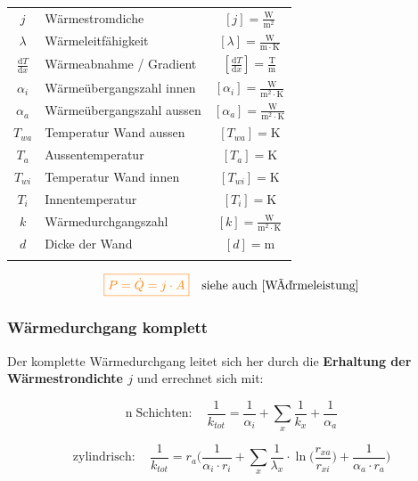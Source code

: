 \begin{tabular}{c l c}
	\rule{0pt}{10pt}$j$ & Wärmestromdiche & $[j] = \mathrm{\frac{W}{m^2}}$ \\
	\rule{0pt}{10pt}$\lambda$ & Wärmeleitfähigkeit & $[\lambda] = \mathrm{\frac{W}{m \cdot K}} $\\
	\rule{0pt}{10pt}$\frac{\mathrm{d} T}{\mathrm{d} x}$ & Wärmeabnahme / Gradient & $ [\frac{\mathrm{d} T}{\mathrm{d} x}] = \mathrm{\frac{T}{m}}$ \\
	\rule{0pt}{10pt}$\alpha_i$ & Wärmeübergangszahl innen & $[\alpha_i] = \mathrm{\frac{W}{m^2 \cdot K}} $\\
	\rule{0pt}{10pt}$\alpha_a$ & Wärmeübergangszahl aussen & $[\alpha_a] = \mathrm{\frac{W}{m^2 \cdot K}} $\\
	$T_{wa}$ & Temperatur Wand aussen & $[T_{wa}] = \mathrm{K}$ \\
	$T_a$ & Aussentemperatur & $[T_a] = \mathrm{K}$ \\
	$T_{wi}$ & Temperatur Wand innen & $[T_{wi}] = \mathrm{K}$ \\
	$T_i$ & Innentemperatur & $[T_i] = \mathrm{K}$ \\
	\rule{0pt}{10pt}$k$ & Wärmedurchgangszahl & $[k] = \mathrm{\frac{W}{m^2 \cdot K}}$ \\
	$d$ & Dicke der Wand & $[d] = \mathrm{m}$ \\
	\\
\end{tabular}


$$ \textcolor{orange}{  \boxed{ P =  \dot{Q} = j \cdot A } } \quad \text{siehe auch \ref{Wärmeleistung}} $$







\subsubsection{Wärmedurchgang komplett}

Der komplette Wärmedurchgang leitet sich her durch die \textbf{Erhaltung der Wärmestrondichte $j$} und errechnet sich mit:


$$ \boxed{\mathrm{n \; Schichten:} \quad \frac{1}{k_{tot}} = \frac{1}{\alpha_i} + \sum_x  \frac{1}{k_x} + \frac{1}{\alpha_a}  }  $$

$$ \boxed{\mathrm{zylindrisch:} \quad \frac{1}{k_{tot}} = r_a \Big(  \frac{1}{\alpha_i \cdot r_i} + \sum_x \frac{1}{\lambda_x} \cdot \ln \big( \frac{r_{xa}}{r_{xi}} \big)  + \frac{1}{\alpha_a \cdot r_a} \Big) }  $$




